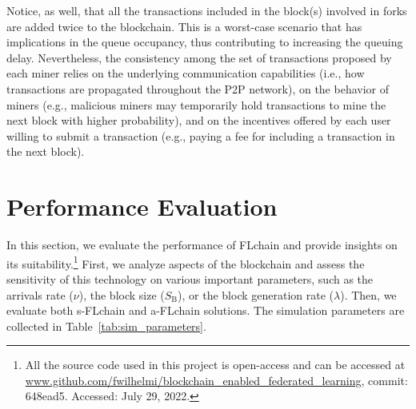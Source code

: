 \documentclass[lettersize,journal]{IEEEtran}
\begin{document}
Notice, as well, that all the transactions included in the block(s) involved in forks are added twice to the blockchain. This is a worst-case scenario that has implications in the queue occupancy, thus contributing to increasing the queuing delay. Nevertheless, the consistency among the set of transactions proposed by each miner relies on the underlying communication capabilities (i.e., how transactions are propagated throughout the P2P network), on the behavior of miners (e.g., malicious miners may temporarily hold transactions to mine the next block with higher probability), and on the incentives offered by each user willing to submit a transaction (e.g., paying a fee for including a transaction in the next block).

\section{Performance Evaluation}
\label{section:results}

In this section, we evaluate the performance of FLchain and provide insights on its suitability.\footnote{All the source code used in this project is open-access and can be accessed at \url{www.github.com/fwilhelmi/blockchain_enabled_federated_learning}, commit: 648ead5. Accessed: July 29, 2022.} First, we analyze aspects of the blockchain and assess the sensitivity of this technology on various important parameters, such as the arrivals rate ($\nu$), the block size ($S_\text{B}$), or the block generation rate ($\lambda$). Then, we evaluate both s-FLchain and a-FLchain solutions. The simulation parameters are collected in Table~\ref{tab:sim_parameters}.
\end{document}
